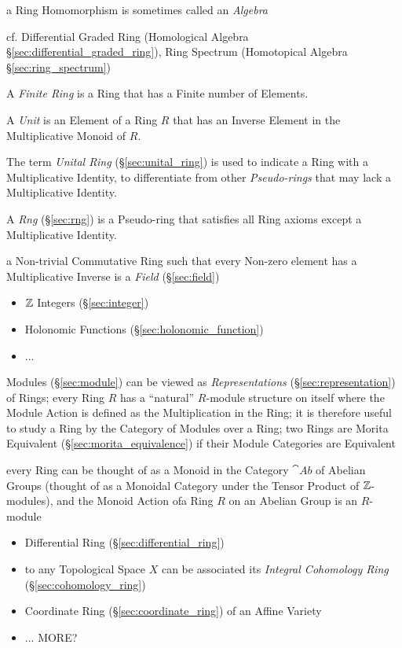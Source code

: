 a Ring Homomorphism is sometimes called an \emph{Algebra}

cf. Differential Graded Ring (Homological Algebra
\S\ref{sec:differential_graded_ring}), Ring Spectrum (Homotopical Algebra
\S\ref{sec:ring_spectrum})

A \emph{Finite Ring} is a Ring that has a Finite number of Elements.

A \emph{Unit} is an Element of a Ring $R$ that has an Inverse
Element in the Multiplicative Monoid of $R$.

The term \emph{Unital Ring} (\S\ref{sec:unital_ring}) is used to
indicate a Ring with a Multiplicative Identity, to differentiate from
other \emph{Pseudo-rings} that may lack a Multiplicative Identity.

A \emph{Rng} (\S\ref{sec:rng}) is a Pseudo-ring that satisfies all
Ring axioms except a Multiplicative Identity.

a Non-trivial Commutative Ring such that every Non-zero element has a
Multiplicative Inverse is a \emph{Field} (\S\ref{sec:field})

\begin{itemize}
  \item $\mathbb{Z}$ Integers (\S\ref{sec:integer})
  \item Holonomic Functions (\S\ref{sec:holonomic_function})
  \item ...
\end{itemize}

\fist Modules (\S\ref{sec:module}) can be viewed as \emph{Representations}
(\S\ref{sec:representation}) of Rings; every Ring $R$ has a ``natural''
$R$-module structure on itself where the Module Action is defined as the
Multiplication in the Ring; it is therefore useful to study a Ring by the
Category of Modules over a Ring; two Rings are Morita Equivalent
(\S\ref{sec:morita_equivalence}) if their Module Categories are Equivalent

every Ring can be thought of as a Monoid in the Category $\cat{Ab}$ of Abelian
Groups (thought of as a Monoidal Category under the Tensor Product of
$\mathbb{Z}$-modules), and the Monoid Action ofa Ring $R$ on an Abelian Group is an
$R$-module

\begin{itemize}
  \item Differential Ring (\S\ref{sec:differential_ring})
  \item to any Topological Space $X$ can be associated its \emph{Integral
    Cohomology Ring} (\S\ref{sec:cohomology_ring})
  \item Coordinate Ring (\S\ref{sec:coordinate_ring}) of an Affine Variety
  \item ... MORE?
\end{itemize}

